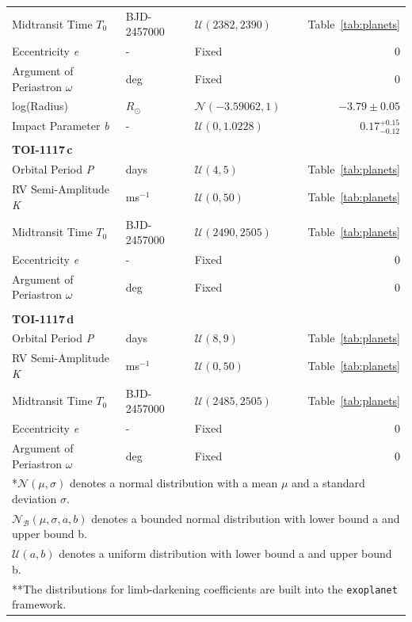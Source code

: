 \documentclass[fleqn,usenatbib,useAMS]{mnras}
\begin{document}
\begin{table}
\begin{tabular}{lllr}
   Midtransit Time $T_0$& BJD-2457000 & $\mathcal{U}\left(2382,2390\right)$ & Table~\ref{tab:planets}\\
   Eccentricity \textit{e} & - & Fixed & 0\\
   Argument of Periastron $\omega$ & deg & Fixed & 0\\
   log(Radius) & $R_{\odot}$ & $\mathcal{N}\left(-3.59062,1\right)$ & $-3.79\pm0.05$\\
   Impact Parameter \textit{b} & - & $\mathcal{U}\left(0,1.0228\right)$ & $0.17^{+0.15}_{-0.12}$\\
   \\{\textbf{TOI-1117\,c}} \\
   Orbital Period \textit{P} & days & $\mathcal{U}\left(4,5\right)$ & Table~\ref{tab:planets}\\
   RV Semi-Amplitude \textit{K} & ms$^{-1}$  & $\mathcal{U}\left(0,50\right)$ & Table~\ref{tab:planets}\\
   Midtransit Time $T_0$& BJD-2457000 & $\mathcal{U}\left(2490,2505\right)$ & Table~\ref{tab:planets}\\
   Eccentricity \textit{e} & - & Fixed & 0\\
   Argument of Periastron $\omega$ & deg & Fixed & 0\\
   \\{\textbf{TOI-1117\,d}}\\
   Orbital Period \textit{P} & days & $\mathcal{U}\left(8,9\right)$ & Table~\ref{tab:planets}\\
   RV Semi-Amplitude \textit{K} & ms$^{-1}$  & $\mathcal{U}\left(0,50\right)$ & Table~\ref{tab:planets}\\
   Midtransit Time $T_0$& BJD-2457000 & $\mathcal{U}\left(2485,2505\right)$ & Table~\ref{tab:planets}\\
   Eccentricity \textit{e} & - & Fixed & 0\\
   Argument of Periastron $\omega$ & deg & Fixed & 0\\
   \hline
   \multicolumn{4}{l}{\footnotesize{*$\mathcal{N}\left(\mu,\sigma\right)$ denotes a normal distribution with a mean $\mu$ and a standard deviation $\sigma$.}}\\
   \multicolumn{4}{l}{\footnotesize{$\mathcal{N}_{\mathcal{B}}\left(\mu,\sigma,a,b\right)$ denotes a bounded normal distribution with lower bound a and upper bound b.}}\\
   \multicolumn{4}{l}{\footnotesize{$\mathcal{U}\left(a,b\right)$ denotes a uniform distribution with lower bound a and upper bound b.}}\\
   \multicolumn{4}{l}{\footnotesize{**The distributions for limb-darkening coefficients are built into the \texttt{exoplanet} framework.}}
 \end{tabular}
\end{table}
\end{document}
